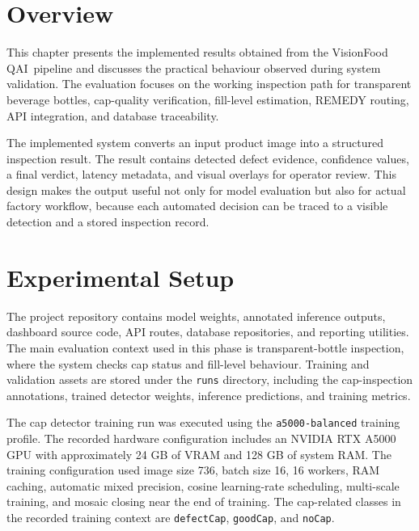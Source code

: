 \documentclass[12pt,a4paper]{report}
\newcommand{\shorttitle}{VisionFood QAI}
\begin{document}
\section{Overview}
\label{sec:results-overview}

This chapter presents the implemented results obtained from the \shorttitle\ pipeline and discusses the practical behaviour observed during system validation. The evaluation focuses on the working inspection path for transparent beverage bottles, cap-quality verification, fill-level estimation, REMEDY routing, API integration, and database traceability.

The implemented system converts an input product image into a structured inspection result. The result contains detected defect evidence, confidence values, a final verdict, latency metadata, and visual overlays for operator review. This design makes the output useful not only for model evaluation but also for actual factory workflow, because each automated decision can be traced to a visible detection and a stored inspection record.

\section{Experimental Setup}
\label{sec:experimental-setup}

The project repository contains model weights, annotated inference outputs, dashboard source code, API routes, database repositories, and reporting utilities. The main evaluation context used in this phase is transparent-bottle inspection, where the system checks cap status and fill-level behaviour. Training and validation assets are stored under the \texttt{runs} directory, including the cap-inspection annotations, trained detector weights, inference predictions, and training metrics.

The cap detector training run was executed using the \texttt{a5000-balanced} training profile. The recorded hardware configuration includes an NVIDIA RTX A5000 GPU with approximately 24 GB of VRAM and 128 GB of system RAM. The training configuration used image size 736, batch size 16, 16 workers, RAM caching, automatic mixed precision, cosine learning-rate scheduling, multi-scale training, and mosaic closing near the end of training. The cap-related classes in the recorded training context are \texttt{defectCap}, \texttt{goodCap}, and \texttt{noCap}.
\end{document}
